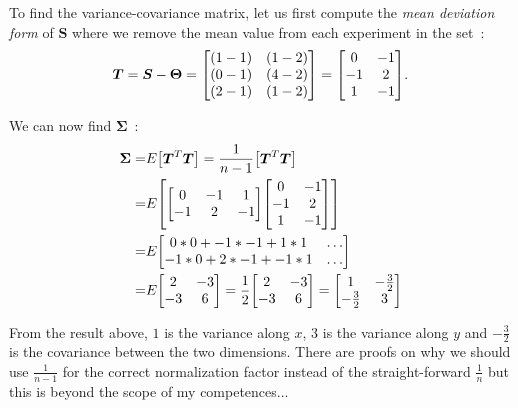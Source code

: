\documentclass[11pt,twocolumn]{amsart} %
\newcommand{\ma}[1]{\boldsymbol{#1}}
\newenvironment{m}{\begin{bmatrix}}{\end{bmatrix}}
\begin{document}
To find the variance-covariance matrix, let us first compute the \emph{mean deviation form} of $\ma{S}$ where we remove the mean value from each experiment in the set~:
\[
  \ma{T} = \ma{S} - \ma\Theta = \begin{m} (1-1) & (1-2) \\ (0-1) & (4-2) \\ (2-1) & (1-2)\end{m} = \begin{m} 0 & -1 \\ -1 & 2 \\ 1 & -1\end{m}.
\]

We can now find $\ma\Sigma$~:
\begin{align*}
  \ma\Sigma = & E \begin{m} \ma{T}^T\ma{T}\end{m} = \frac{1}{n-1} \begin{m} \ma{T}^T\ma{T}\end{m} \\
         = & E \begin{m} \begin{m} 0 & -1 & 1 \\ -1 & 2 & -1\end{m} \begin{m} 0 & -1 \\ -1 & 2 \\ 1 & -1\end{m} \end{m} \\
         = & E \begin{m} 0*0 + -1*-1 + 1*1 & \hdots \\ -1*0 + 2*-1 + -1*1 & \hdots \end{m} \\
         = & E \begin{m} 2 & -3 \\ -3 & 6 \end{m} = \frac{1}{2} \begin{m} 2 & -3 \\ -3 & 6 \end{m}
         = \begin{m} 1 & -\frac{3}{2} \\ -\frac{3}{2} & 3\end{m}
\end{align*}

From the result above, $1$ is the variance along $x$, $3$ is the variance along $y$ and $-\frac{3}{2}$ is the covariance between the two dimensions. There are proofs on why we should use $\frac{1}{n-1}$ for the correct normalization factor instead of the straight-forward $\frac{1}{n}$ but this is beyond the scope of my competences...
\end{document}
